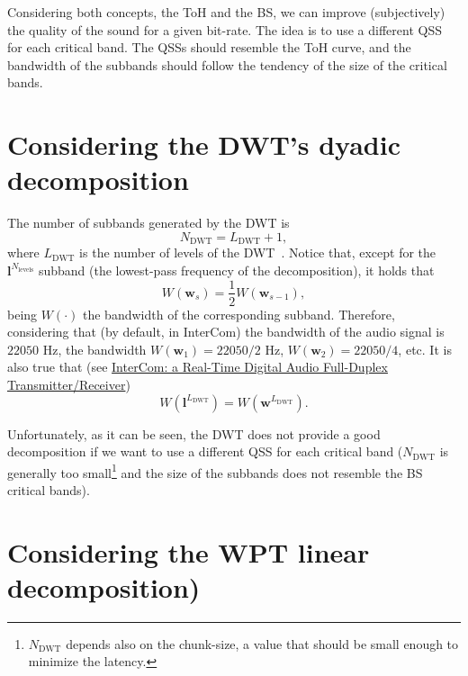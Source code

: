 
Considering both concepts, the ToH and the BS, we can improve
(subjectively) the quality of the sound for a given bit-rate. The idea
is to use a different QSS for each critical band. The QSSs should
resemble the ToH curve, and the bandwidth of the subbands should
follow the tendency of the size of the critical bands.

\section{Considering the DWT's dyadic decomposition}

The number of subbands generated by the DWT is
\begin{equation}
  N_{\text{DWT}} = L_{\text{DWT}}+1,
\end{equation}
where $L_\text{DWT}$ is the number of levels of the
DWT~\cite{vetterli1995wavelets}. Notice that, except for the
${\mathbf l}^{N_{\text{levels}}}$ subband (the lowest-pass frequency
of the decomposition), it holds that
\begin{equation}
  W({\mathbf w}_s) = \frac{1}{2}W({\mathbf w}_{s-1}),
\end{equation}
being $W(\cdot)$ the bandwidth of the corresponding
subband. Therefore, considering that (by default, in InterCom) the
bandwidth of the audio signal is $22050$ Hz, the bandwidth $W({\mathbf
  w}_1)=22050/2$ Hz, $W({\mathbf w}_2)=22050/4$, etc. It is also true
that (see
\href{https://github.com/Tecnologias-multimedia/InterCom/blob/master/docs/2-hours_seminar.ipynb}{
  InterCom: a Real-Time Digital Audio Full-Duplex
  Transmitter/Receiver})
\begin{equation}
  W({\mathbf l}^{L_{\text{DWT}}}) = W({\mathbf w}^{L_{\text{DWT}}}).
\end{equation}

Unfortunately, as it can be seen, the DWT does not provide a good
decomposition if we want to use a different QSS for each critical band
($N_{\text{DWT}}$ is generally too small\footnote{$N_{\text{DWT}}$
depends also on the chunk-size, a value that should be small enough to
minimize the latency.} and the size of the subbands does not resemble
the BS critical bands).

\section{Considering the WPT linear decomposition)}

